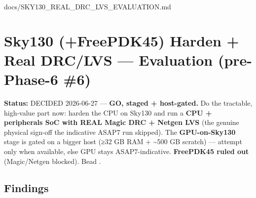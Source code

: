\begin{relocated}{docs/SKY130_REAL_DRC_LVS_EVALUATION.md}
\section{Sky130 (+FreePDK45) Harden + Real DRC/LVS --- Evaluation
(pre-Phase-6 \#6)}\label{tm:pd:sky130-real-drc-lvs}

\textbf{Status:} DECIDED 2026-06-27 --- \textbf{GO, staged +
host-gated.} Do the tractable, high-value part now: harden the CPU on
Sky130 and run a \textbf{CPU + peripherals SoC with REAL Magic DRC +
Netgen LVS} (the genuine physical sign-off the indicative ASAP7 run
skipped). The \textbf{GPU-on-Sky130} stage is gated on a bigger host
(≥32 GB RAM + \textasciitilde500 GB scratch) --- attempt only when
available, else GPU stays ASAP7-indicative. \textbf{FreePDK45 ruled out}
(Magic/\allowbreak{}Netgen blocked). Bead
.

\subsection{Findings}\label{tm:pd:sky130-real-drc-lvs:1-findings}


\end{relocated}
